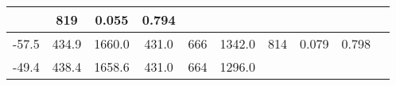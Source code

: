 \documentclass[a4paper,10pt]{article}
\begin{document}
\begin{longtable}{
     |
%    
    c|
%    
    c|
%    
    c|
%    
    c|
%    
    c|
%    
    c|
%    
    c|
%    
    c|
%    
    c|
%    
    c|
%    
    }
%        
        & 819
%        

%        

%        
        & 0.055
%        

%        

%        
        & 0.794
%        

%        
        \\
        \hline

        

%        

%        
        -57.5
%        

%        

%        
        & 434.9
%        

%        

%        
        & 1660.0
%        

%        

%        
        & 431.0
%        

%        

%        
        & 666
%        

%        

%        
        & 1342.0
%        

%        

%        
        & 814
%        

%        

%        
        & 0.079
%        

%        

%        
        & 0.798
%        

%        
        \\
        \hline

        

%        

%        
        -49.4
%        

%        

%        
        & 438.4
%        

%        

%        
        & 1658.6
%        

%        

%        
        & 431.0
%        

%        

%        
        & 664
%        

%        

%        
        & 1296.0
%        

%        


\end{longtable}
\end{document}
